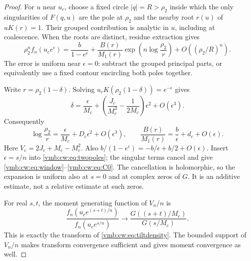 \documentclass[11pt,a4paper]{article}
\numberwithin{equation}{section}
\theoremstyle{definition}\newtheorem{definition}[theorem]{Definition}
\theoremstyle{remark}\newtheorem{remark}[theorem]{Remark}
\begin{document}
\begin{proof}
For $u$ near $u_c$, choose a fixed circle $|q|=R>\rho_2$ inside which the only
singularities of $F(q,u)$ are the pole at $\rho_2$ and the nearby root $r(u)$ of
$uK(r)=1$. Their grouped contribution is analytic in $u$, including at
coalescence. When the roots are distinct, residue extraction gives
\begin{equation}\label{vmb:cw:eq:twopoles}
 \rho_2^nf_n(u_c e^\epsilon)
 =\frac{b}{1-e^\epsilon}
 +\frac{B(r)}{M_1(r)}\exp\!\left(n\log\frac{\rho_2}r\right)
 +O((\rho_2/R)^n).
\end{equation}
The error is uniform near $\epsilon=0$: subtract the grouped principal
parts, or equivalently use a fixed contour encircling both poles together.

Write $r=\rho_2(1-\delta)$. Solving
$u_cK(\rho_2(1-\delta))=e^{-\epsilon}$ gives
\begin{equation}\label{vmb:cw:eq:deltacrit}
 \delta=\frac\epsilon{M_c}+
 \left(\frac {J_c}{M_c^3}-\frac1{2M_c}\right)\epsilon^2+O(\epsilon^3).
\end{equation}
Consequently
\begin{equation}\label{vmb:cw:eq:logrcrit}
 \log\frac{\rho_2}r=\frac\epsilon{M_c}+D_c\epsilon^2+O(\epsilon^3),
 \qquad
 \frac{B(r)}{M_1(r)}=\frac b\epsilon+d_c+O(\epsilon).
\end{equation}
Here $V_c=2J_c+M_c-M_c^2$. Also
$b/(1-e^\epsilon)=-b/\epsilon+b/2+O(\epsilon)$.
Insert $\epsilon=s/n$ into \eqref{vmb:cw:eq:twopoles}; the singular terms cancel
and give \eqref{vmb:cw:eq:window}--\eqref{vmb:cw:eq:C0}. The cancellation is holomorphic,
so the expansion is uniform also at $s=0$ and at complex zeros of $G$.
It is an additive estimate, not a relative estimate at such zeros.

For real $s,t$, the moment generating function of $V_n/n$ is
\[
 \frac{f_n(u_c e^{(s+t)/n})}{f_n(u_c e^{s/n})}
 \longrightarrow\frac{G((s+t)/M_c)}{G(s/M_c)}.
\]
This is exactly the transform of \eqref{vmb:cw:eq:tiltdensity}. The bounded support
of $V_n/n$ makes transform convergence sufficient and gives moment
convergence as well.
\end{proof}
\end{document}
